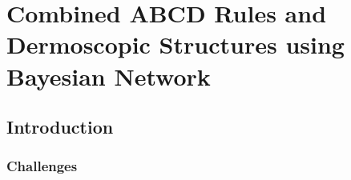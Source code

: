 \chapter{Combined ABCD Rules and Dermoscopic Structures using Bayesian Network}

\section{Introduction}

%

\subsection{Challenges}
